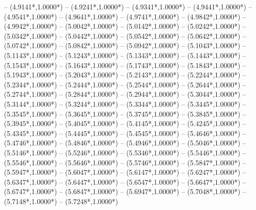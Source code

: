 {	-- ({4.9141*\dx},{1.0000*\dy})
	-- ({4.9241*\dx},{1.0000*\dy})
	-- ({4.9341*\dx},{1.0000*\dy})
	-- ({4.9441*\dx},{1.0000*\dy})
	-- ({4.9541*\dx},{1.0000*\dy})
	-- ({4.9641*\dx},{1.0000*\dy})
	-- ({4.9741*\dx},{1.0000*\dy})
	-- ({4.9842*\dx},{1.0000*\dy})
	-- ({4.9942*\dx},{1.0000*\dy})
	-- ({5.0042*\dx},{1.0000*\dy})
	-- ({5.0142*\dx},{1.0000*\dy})
	-- ({5.0242*\dx},{1.0000*\dy})
	-- ({5.0342*\dx},{1.0000*\dy})
	-- ({5.0442*\dx},{1.0000*\dy})
	-- ({5.0542*\dx},{1.0000*\dy})
	-- ({5.0642*\dx},{1.0000*\dy})
	-- ({5.0742*\dx},{1.0000*\dy})
	-- ({5.0842*\dx},{1.0000*\dy})
	-- ({5.0942*\dx},{1.0000*\dy})
	-- ({5.1043*\dx},{1.0000*\dy})
	-- ({5.1143*\dx},{1.0000*\dy})
	-- ({5.1243*\dx},{1.0000*\dy})
	-- ({5.1343*\dx},{1.0000*\dy})
	-- ({5.1443*\dx},{1.0000*\dy})
	-- ({5.1543*\dx},{1.0000*\dy})
	-- ({5.1643*\dx},{1.0000*\dy})
	-- ({5.1743*\dx},{1.0000*\dy})
	-- ({5.1843*\dx},{1.0000*\dy})
	-- ({5.1943*\dx},{1.0000*\dy})
	-- ({5.2043*\dx},{1.0000*\dy})
	-- ({5.2143*\dx},{1.0000*\dy})
	-- ({5.2244*\dx},{1.0000*\dy})
	-- ({5.2344*\dx},{1.0000*\dy})
	-- ({5.2444*\dx},{1.0000*\dy})
	-- ({5.2544*\dx},{1.0000*\dy})
	-- ({5.2644*\dx},{1.0000*\dy})
	-- ({5.2744*\dx},{1.0000*\dy})
	-- ({5.2844*\dx},{1.0000*\dy})
	-- ({5.2944*\dx},{1.0000*\dy})
	-- ({5.3044*\dx},{1.0000*\dy})
	-- ({5.3144*\dx},{1.0000*\dy})
	-- ({5.3244*\dx},{1.0000*\dy})
	-- ({5.3344*\dx},{1.0000*\dy})
	-- ({5.3445*\dx},{1.0000*\dy})
	-- ({5.3545*\dx},{1.0000*\dy})
	-- ({5.3645*\dx},{1.0000*\dy})
	-- ({5.3745*\dx},{1.0000*\dy})
	-- ({5.3845*\dx},{1.0000*\dy})
	-- ({5.3945*\dx},{1.0000*\dy})
	-- ({5.4045*\dx},{1.0000*\dy})
	-- ({5.4145*\dx},{1.0000*\dy})
	-- ({5.4245*\dx},{1.0000*\dy})
	-- ({5.4345*\dx},{1.0000*\dy})
	-- ({5.4445*\dx},{1.0000*\dy})
	-- ({5.4545*\dx},{1.0000*\dy})
	-- ({5.4646*\dx},{1.0000*\dy})
	-- ({5.4746*\dx},{1.0000*\dy})
	-- ({5.4846*\dx},{1.0000*\dy})
	-- ({5.4946*\dx},{1.0000*\dy})
	-- ({5.5046*\dx},{1.0000*\dy})
	-- ({5.5146*\dx},{1.0000*\dy})
	-- ({5.5246*\dx},{1.0000*\dy})
	-- ({5.5346*\dx},{1.0000*\dy})
	-- ({5.5446*\dx},{1.0000*\dy})
	-- ({5.5546*\dx},{1.0000*\dy})
	-- ({5.5646*\dx},{1.0000*\dy})
	-- ({5.5746*\dx},{1.0000*\dy})
	-- ({5.5847*\dx},{1.0000*\dy})
	-- ({5.5947*\dx},{1.0000*\dy})
	-- ({5.6047*\dx},{1.0000*\dy})
	-- ({5.6147*\dx},{1.0000*\dy})
	-- ({5.6247*\dx},{1.0000*\dy})
	-- ({5.6347*\dx},{1.0000*\dy})
	-- ({5.6447*\dx},{1.0000*\dy})
	-- ({5.6547*\dx},{1.0000*\dy})
	-- ({5.6647*\dx},{1.0000*\dy})
	-- ({5.6747*\dx},{1.0000*\dy})
	-- ({5.6847*\dx},{1.0000*\dy})
	-- ({5.6947*\dx},{1.0000*\dy})
	-- ({5.7048*\dx},{1.0000*\dy})
	-- ({5.7148*\dx},{1.0000*\dy})
	-- ({5.7248*\dx},{1.0000*\dy})
}
